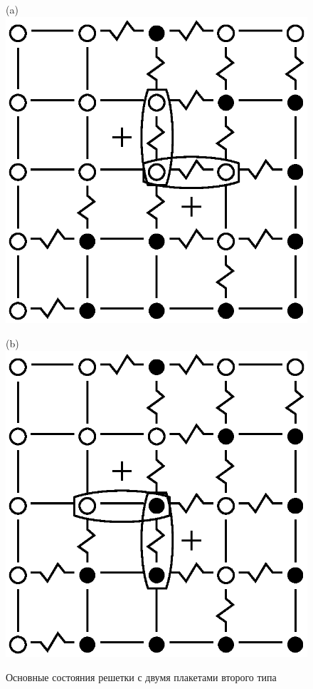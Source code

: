 \documentclass[utf8, babel, sor, jor, amsmath, amssymb, reprint]{elsarticle} %
\begin{document}
\begin{figure}[H]
	\centering
	\begin{minipage}[h]{0.25\linewidth}
		\centering(a)
		\includegraphics[width=1\linewidth]{pictures/Cl5x5_Type2_gs1.eps}
	\end{minipage}
	\hspace{15pt}
	\begin{minipage}[h]{0.25\linewidth}
		\centering(b)
		\includegraphics[width=1\linewidth]{pictures/Cl5x5_Type2_gs2.eps}
	\end{minipage}
	\caption{Основные состояния решетки с двумя плакетами второго типа}
	\label{fig:5x5.22F}
\end{figure}
\end{document}
